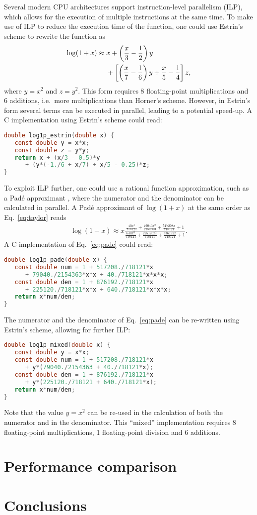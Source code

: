 \documentclass[10pt,DIV16,twocolumn]{scrartcl}
\begin{document}
Several modern CPU architectures support instruction-level parallelism
(ILP), which allows for the execution of multiple instructions at the
same time.  To make use of ILP to reduce the execution time of the
function, one could use Estrin's scheme \cite{estrin} to rewrite the
function as
%
\begin{align}
  \log(1+x) \approx{}& x + \left(\frac{x}{3}-\frac{1}{2}\right)
    y \notag \\ &+\left[\left(\frac{x}{7}-\frac{1}{6}\right)
    y+\frac{x}{5}-\frac{1}{4}\right] z,
  \label{eq:estrin}
\end{align}
%
where $y=x^2$ and $z=y^2$.  This form requires 8 floating-point
multiplications and 6 additions, i.e.\ more multiplications than
Horner's scheme.  However, in Estrin's form several terms can be
executed in parallel, leading to a potential speed-up.  A C
implementation using Estrin's scheme could read:
%
\begin{lstlisting}[language=C]
double log1p_estrin(double x) {
   const double y = x*x;
   const double z = y*y;
   return x + (x/3 - 0.5)*y
      + (y*(-1./6 + x/7) + x/5 - 0.25)*z;
}
\end{lstlisting}

To exploit ILP further, one could use a rational function
approximation, such as a Padé approximant \cite{pade}, where the
numerator and the denominator can be calculated in parallel.  A Padé
approximant of $\log(1+x)$ at the same order as Eq.~\eqref{eq:taylor}
reads
%
\begin{align}
  \log(1+x) \approx x
  \frac{\frac{40 x^3}{718121}+\frac{79040 x^2}{2154363}+\frac{517208
    x}{718121}+1}{\frac{640 x^3}{718121}+\frac{225120 x^2}{718121}+\frac{876192
    x}{718121}+1}.
  \label{eq:pade}
\end{align}
%
A C implementation of Eq.~\eqref{eq:pade} could read:
%
\begin{lstlisting}[language=C]
double log1p_pade(double x) {
   const double num = 1 + 517208./718121*x
      + 79040./2154363*x*x + 40./718121*x*x*x;
   const double den = 1 + 876192./718121*x
      + 225120./718121*x*x + 640./718121*x*x*x;
   return x*num/den;
}
\end{lstlisting}
%
The numerator and the denominator of Eq.~\eqref{eq:pade} can be
re-written using Estrin's scheme, allowing for further ILP:
%
\begin{lstlisting}[language=C]
double log1p_mixed(double x) {
   const double y = x*x;
   const double num = 1 + 517208./718121*x
      + y*(79040./2154363 + 40./718121*x);
   const double den = 1 + 876192./718121*x
      + y*(225120./718121 + 640./718121*x);
   return x*num/den;
}
\end{lstlisting}
%
Note that the value $y=x^2$ can be re-used in the calculation of both
the numerator and in the denominator.  This ``mixed'' implementation
requires 8 floating-point multiplications, 1 floating-point division
and 6 additions.

\section{Performance comparison}

\section{Conclusions}



\end{document}
